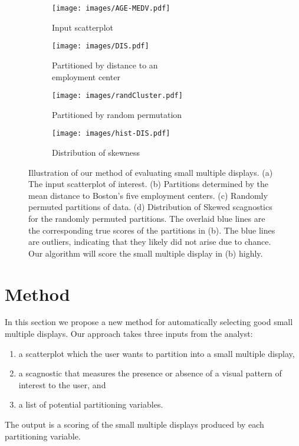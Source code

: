 
\begin{figure*}
 \centering 
    \begin{subfigure}[t]{1.3in}
        \texttt{[image: images/AGE-MEDV.pdf]}
        \caption{Input scatterplot}
        \label{fig:method_original}
    \end{subfigure}
    \begin{subfigure}[t]{1.5in}
  	\texttt{[image: images/DIS.pdf]}
	\caption{Partitioned by distance to an\\ employment center}
	 \label{fig:method_actual}
    \end{subfigure}
    \begin{subfigure}[t]{1.5in}
 	 \texttt{[image: images/randCluster.pdf]}
     \vspace{-0.37cm}
 	 \caption{Partitioned by random permutation}
	 \label{fig:method_random}
    \end{subfigure}
     \begin{subfigure}[t]{2.5in}
 	\texttt{[image: images/hist-DIS.pdf]}
	\caption{Distribution of skewness}
	 \label{fig:method_dist}
     \end{subfigure}
   \caption{Illustration of our method of evaluating small multiple displays. (a) The input scatterplot of interest. (b) Partitions determined by the mean distance to Boston's five employment centers. (c) Randomly permuted partitions of data. (d) Distribution of Skewed scagnostics for the randomly permuted partitions. The overlaid blue lines are the corresponding true scores of the partitions in (b). The blue lines are outliers, indicating that they likely did not arise due to chance. Our algorithm will score the small multiple display in (b) highly.}
\end{figure*}


\section{Method}
\label{sec:method}

In this section we propose a new method for automatically selecting good small multiple displays. Our approach takes three inputs from the analyst:
\begin{enumerate}
\item a scatterplot which the user wants to partition into a small multiple display,
\item a scagnostic that measures the presence or absence of a visual pattern of interest to the user, and
\item a list of potential partitioning variables.
\end{enumerate}
The output is a scoring of the small multiple displays produced by each partitioning variable.


